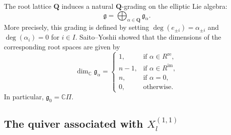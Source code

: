 \documentclass[12pt,reqno]{amsart}
\numberwithin{equation}{section}
\renewcommand{\deg}{\operatorname{deg}\nolimits}
\renewcommand{\dim}{\operatorname{dim}\nolimits}
\begin{document}
	The root lattice $\mathbf{Q}$ induces a natural $\mathbf{Q}$-grading on the elliptic Lie algebra:
	\[
	\mathfrak{g}=\bigoplus_{\alpha\in \mathbf{Q}}\mathfrak{g}_{\alpha}.  
	\]
	More precisely, this grading is defined by setting $\deg(e_{\pm i})=\alpha_{\pm i}$ and $\deg(\alpha_i)=0$ for $i\in I$.
	Saito--Yoshii \cite{SY00} showed that the dimensions of the corresponding root spaces are given by
	\[
	\dim_{\mathbb{C}}\mathfrak{g}_{\alpha}=
	\begin{cases}
		1, & \text{if } \alpha\in R^{\mathrm{re}},\\
		n-1, & \text{if } \alpha\in R^{\mathrm{im}},\\
		n, & \text{if } \alpha=0,\\
		0, & \text{otherwise}.
	\end{cases}  
	\]
	In particular, $\mathfrak{g}_0=\mathbb{C}\Pi$.
	
	
	\subsection{The quiver associated with $X_l^{(1,1)}$}\label{ss:tri-cat-ell-Lie}
	
\end{document}
